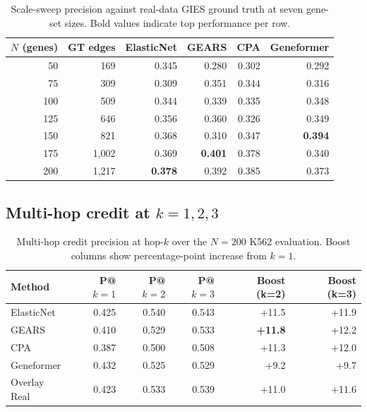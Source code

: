 \documentclass{article}
\theoremstyle{plain}
\theoremstyle{definition}
\theoremstyle{remark}
\begin{document}
\begin{table}[h]
\centering
\small
\begin{tabular}{rrrrrr}
\toprule
\textbf{$N$ (genes)} & \textbf{GT edges} & \textbf{ElasticNet} & \textbf{GEARS} & \textbf{CPA} & \textbf{Geneformer} \\
\midrule
50  & 169   & 0.345 & 0.280 & 0.302 & 0.292 \\
75  & 309   & 0.309 & 0.351 & 0.344 & 0.316 \\
100 & 509   & 0.344 & 0.339 & 0.335 & 0.348 \\
125 & 646   & 0.356 & 0.360 & 0.326 & 0.349 \\
150 & 821   & 0.368 & 0.310 & 0.347 & \textbf{0.394} \\
175 & 1{,}002 & 0.369 & \textbf{0.401} & 0.378 & 0.340 \\
200 & 1{,}217 & \textbf{0.378} & 0.392 & 0.385 & 0.373 \\
\bottomrule
\end{tabular}
\caption{Scale-sweep precision against real-data GIES ground truth at seven gene-set sizes. Bold values indicate top performance per row.}
\end{table}

\subsection{Multi-hop credit at $k = 1, 2, 3$}

\begin{table}[h]
\centering
\small
\begin{tabular}{lrrrrr}
\toprule
\textbf{Method} & \textbf{P@$k{=}1$} & \textbf{P@$k{=}2$} & \textbf{P@$k{=}3$} & \textbf{Boost (k=2)} & \textbf{Boost (k=3)} \\
\midrule
ElasticNet  & 0.425 & 0.540 & 0.543 & +11.5 & +11.9 \\
GEARS       & 0.410 & 0.529 & 0.533 & \textbf{+11.8} & +12.2 \\
CPA         & 0.387 & 0.500 & 0.508 & +11.3 & +12.0 \\
Geneformer  & 0.432 & 0.525 & 0.529 & +9.2  & +9.7  \\
Overlay Real & 0.423 & 0.533 & 0.539 & +11.0 & +11.6 \\
\bottomrule
\end{tabular}
\caption{Multi-hop credit precision at hop-$k$ over the $N{=}200$ K562 evaluation. Boost columns show percentage-point increase from $k{=}1$.}
\end{table}
\end{document}

